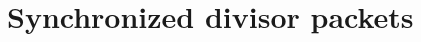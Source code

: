 \documentclass[11pt]{article}
\begin{document}
\section{Synchronized divisor packets}
\label{sec:synchronized-divisor-packets}

\end{document}
